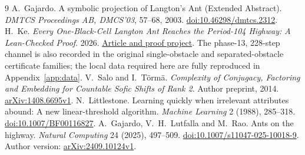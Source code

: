 \documentclass[11pt]{article}
\theoremstyle{definition}\newtheorem{definition}[theorem]{Definition}
\theoremstyle{remark}\newtheorem{remark}[theorem]{Remark}
\begin{document}
\begin{thebibliography}{9}
 A.~Gajardo. A symbolic projection of Langton's Ant
(Extended Abstract). \emph{DMTCS Proceedings AB, DMCS'03}, 57--68, 2003.
\href{https://doi.org/10.46298/dmtcs.2312}{doi:10.46298/dmtcs.2312}.
 H.~Ke. \emph{Every One-Black-Cell Langton Ant Reaches the
Period-104 Highway: A Lean-Checked Proof}. 2026.
\href{https://github.com/kehao95/langtons-ant-core/tree/08fd2a5fd07dde19ecf0177498e07463f2bb55f9/one_black}{Article and proof project}.
The phase-13, 228-step channel is also recorded in the original single-obstacle
and separated-obstacle certificate families; the local data required here are
fully reproduced in Appendix~\ref{app:data}.
 V.~Salo and I.~T\"orm\"a.
\emph{Complexity of Conjugacy, Factoring and Embedding for Countable Sofic
Shifts of Rank 2}. Author preprint, 2014.
\href{https://arxiv.org/abs/1408.6695v1}{arXiv:1408.6695v1}.
 N.~Littlestone.
Learning quickly when irrelevant attributes abound: A new linear-threshold algorithm.
\emph{Machine Learning} 2 (1988), 285--318.
\href{https://doi.org/10.1007/BF00116827}{doi:10.1007/BF00116827}.
 A.~Gajardo, V.~H.~Lutfalla and M.~Rao.
Ants on the highway. \emph{Natural Computing} 24 (2025), 497--509.
\href{https://doi.org/10.1007/s11047-025-10018-9}{doi:10.1007/s11047-025-10018-9}.
Author version: \href{https://arxiv.org/abs/2409.10124v1}{arXiv:2409.10124v1}.
\end{thebibliography}
\end{document}
